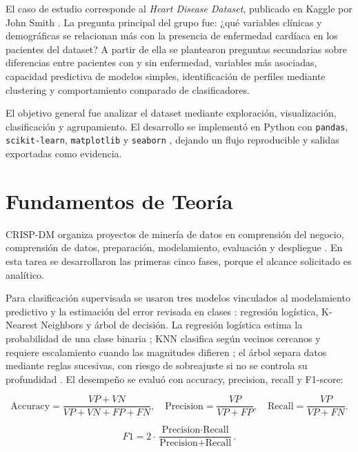 \documentclass[10pt,a4paper]{article}
\begin{document}
El caso de estudio corresponde al \textit{Heart Disease Dataset}, publicado en Kaggle por John Smith \citep{smithkaggle}. La pregunta principal del grupo fue: ¿qué variables clínicas y demográficas se relacionan más con la presencia de enfermedad cardíaca en los pacientes del dataset? A partir de ella se plantearon preguntas secundarias sobre diferencias entre pacientes con y sin enfermedad, variables más asociadas, capacidad predictiva de modelos simples, identificación de perfiles mediante clustering y comportamiento comparado de clasificadores.

El objetivo general fue analizar el dataset mediante exploración, visualización, clasificación y agrupamiento. El desarrollo se implementó en Python con \texttt{pandas}, \texttt{scikit-learn}, \texttt{matplotlib} y \texttt{seaborn} \citep{pandas2020,sklearn2011,hunter2007,waskom2021}, dejando un flujo reproducible y salidas exportadas como evidencia.

\section{Fundamentos de Teoría}

CRISP-DM organiza proyectos de minería de datos en comprensión del negocio, comprensión de datos, preparación, modelamiento, evaluación y despliegue \citep{chapman2000,levano2026crispdm}. En esta tarea se desarrollaron las primeras cinco fases, porque el alcance solicitado es analítico.

Para clasificación supervisada se usaron tres modelos vinculados al modelamiento predictivo y la estimación del error revisada en clases \citep{levano2026regresion}: regresión logística, K-Nearest Neighbors y árbol de decisión. La regresión logística estima la probabilidad de una clase binaria \citep{hosmer2013}; KNN clasifica según vecinos cercanos y requiere escalamiento cuando las magnitudes difieren \citep{james2021}; el árbol separa datos mediante reglas sucesivas, con riesgo de sobreajuste si no se controla su profundidad \citep{breiman1984}. El desempeño se evaluó con accuracy, precision, recall y F1-score:

\begin{equation}
  \text{Accuracy}=\frac{VP+VN}{VP+VN+FP+FN}, \quad
  \text{Precision}=\frac{VP}{VP+FP}, \quad
  \text{Recall}=\frac{VP}{VP+FN}.
\end{equation}

\begin{equation}
  F1 = 2 \cdot \frac{\text{Precision}\cdot\text{Recall}}{\text{Precision}+\text{Recall}}.
\end{equation}
\end{document}
